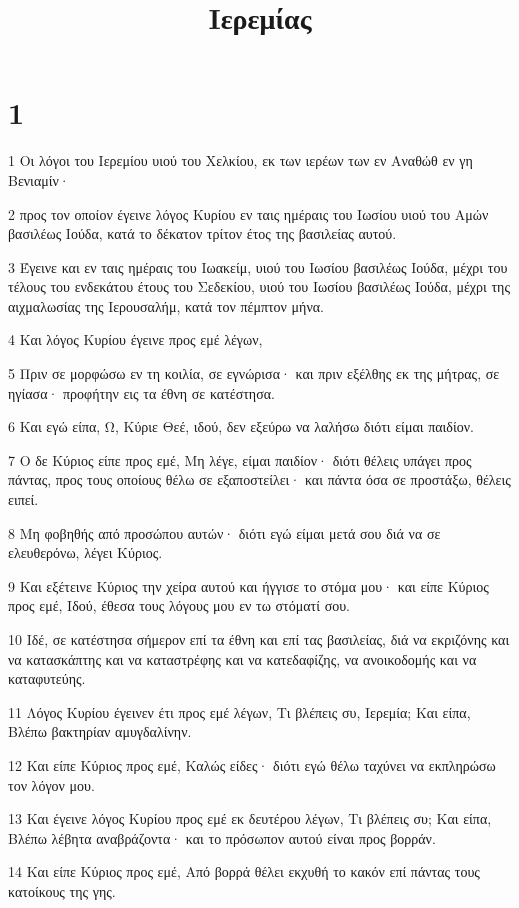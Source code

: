 

\title{Ιερεμίας}


\chapter{1}

\par 1 Οι λόγοι του Ιερεμίου υιού του Χελκίου, εκ των ιερέων των εν Αναθώθ εν γη Βενιαμίν·
\par 2 προς τον οποίον έγεινε λόγος Κυρίου εν ταις ημέραις του Ιωσίου υιού του Αμών βασιλέως Ιούδα, κατά το δέκατον τρίτον έτος της βασιλείας αυτού.
\par 3 Έγεινε και εν ταις ημέραις του Ιωακείμ, υιού του Ιωσίου βασιλέως Ιούδα, μέχρι του τέλους του ενδεκάτου έτους του Σεδεκίου, υιού του Ιωσίου βασιλέως Ιούδα, μέχρι της αιχμαλωσίας της Ιερουσαλήμ, κατά τον πέμπτον μήνα.
\par 4 Και λόγος Κυρίου έγεινε προς εμέ λέγων,
\par 5 Πριν σε μορφώσω εν τη κοιλία, σε εγνώρισα· και πριν εξέλθης εκ της μήτρας, σε ηγίασα· προφήτην εις τα έθνη σε κατέστησα.
\par 6 Και εγώ είπα, Ω, Κύριε Θεέ, ιδού, δεν εξεύρω να λαλήσω διότι είμαι παιδίον.
\par 7 Ο δε Κύριος είπε προς εμέ, Μη λέγε, είμαι παιδίον· διότι θέλεις υπάγει προς πάντας, προς τους οποίους θέλω σε εξαποστείλει· και πάντα όσα σε προστάξω, θέλεις ειπεί.
\par 8 Μη φοβηθής από προσώπου αυτών· διότι εγώ είμαι μετά σου διά να σε ελευθερόνω, λέγει Κύριος.
\par 9 Και εξέτεινε Κύριος την χείρα αυτού και ήγγισε το στόμα μου· και είπε Κύριος προς εμέ, Ιδού, έθεσα τους λόγους μου εν τω στόματί σου.
\par 10 Ιδέ, σε κατέστησα σήμερον επί τα έθνη και επί τας βασιλείας, διά να εκριζόνης και να κατασκάπτης και να καταστρέφης και να κατεδαφίζης, να ανοικοδομής και να καταφυτεύης.
\par 11 Λόγος Κυρίου έγεινεν έτι προς εμέ λέγων, Τι βλέπεις συ, Ιερεμία; Και είπα, Βλέπω βακτηρίαν αμυγδαλίνην.
\par 12 Και είπε Κύριος προς εμέ, Καλώς είδες· διότι εγώ θέλω ταχύνει να εκπληρώσω τον λόγον μου.
\par 13 Και έγεινε λόγος Κυρίου προς εμέ εκ δευτέρου λέγων, Τι βλέπεις συ; Και είπα, Βλέπω λέβητα αναβράζοντα· και το πρόσωπον αυτού είναι προς βορράν.
\par 14 Και είπε Κύριος προς εμέ, Από βορρά θέλει εκχυθή το κακόν επί πάντας τους κατοίκους της γης.
